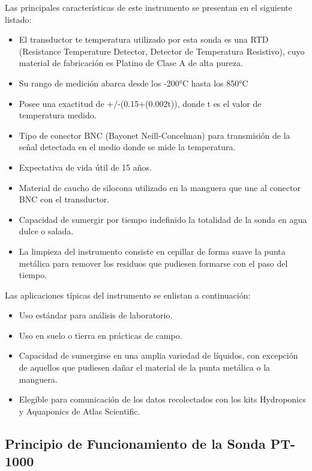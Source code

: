 \clearpage

Las principales características de este instrumento se presentan en el siguiente listado:

\begin{itemize}
    \item El transductor te temperatura utilizado por esta sonda es una RTD (Resistance Temperature Detector, Detector de Temperatura Resistivo), cuyo material de fabricación es Platino de Clase A de alta pureza.
    \item Su rango de medición abarca desde los -200°C hasta los 850°C 
    \item Posee una exactitud de +/-(0.15+(0.002t)), donde t es el valor de temperatura medido.
    \item Tipo de conector BNC (Bayonet Neill-Concelman) para transmisión de la señal detectada en el medio donde se mide la temperatura.
    \item Expectativa de vida útil de 15 años.
    \item Material de caucho de silocona utilizado en la manguera que une al conector BNC con el transductor.
    \item Capacidad de sumergir por tiempo indefinido la totalidad de la sonda en agua dulce o salada.
    \item La limpieza del instrumento consiste en cepillar de forma suave la punta metálica para remover los residuos que pudiesen formarse con el paso del tiempo.  
\end{itemize}


Las aplicaciones típicas del instrumento se enlistan a continuación:

\begin{itemize}
    \item Uso estándar para análisis de laboratorio.
    \item Uso en suelo o tierra en prácticas de campo.
    \item Capacidad de sumergirse en una amplia variedad de líquidos, con excepción de aquellos que pudiesen dañar el material de la punta metálica o la manguera.
    \item Elegible para comunicación de los datos recolectados con los kits Hydroponics y Aquaponics de Atlas Scientific.
\end{itemize}

\subsection{Principio de Funcionamiento de la Sonda PT-1000}

